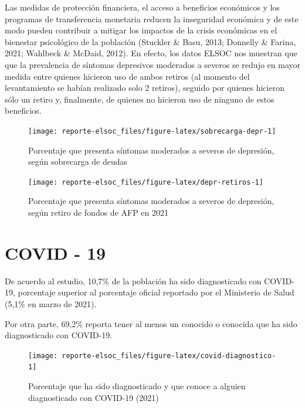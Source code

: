 \documentclass[
  12pt,
]{book}
\begin{document}
Las medidas de protección financiera, el acceso a beneficios económicos y los programas de transferencia monetaria reducen la inseguridad económica y de este modo pueden contribuir a mitigar los impactos de la crisis económicas en el bienestar psicológico de la población (Stuckler \& Basu, 2013; Donnelly \& Farina, 2021; Wahlbeck \& McDaid, 2012). En efecto, los datos ELSOC nos muestran que que la prevalencia de síntomas depresivos moderados a severos se redujo en mayor medida entre quienes hicieron uso de ambos retiros (al momento del levantamiento se habían realizado solo 2 retiros), seguido por quienes hicieron sólo un retiro y, finalmente, de quienes no hicieron uso de ninguno de estos beneficios.

\begin{figure}

{\centering \texttt{[image: reporte-elsoc\_files/figure-latex/sobrecarga-depr-1]} 

}

\caption{Porcentaje que presenta síntomas moderados a severos de depresión, según sobrecarga de deudas}\label{fig:sobrecarga-depr}
\end{figure}

\begin{figure}

{\centering \texttt{[image: reporte-elsoc\_files/figure-latex/depr-retiros-1]} 

}

\caption{Porcentaje que presenta síntomas moderados a severos de depresión, según retiro de fondos de AFP en 2021}\label{fig:depr-retiros}
\end{figure}

\hypertarget{covid---19}{%
\section{COVID - 19}\label{covid---19}}

De acuerdo al estudio, 10,7\% de la población ha sido diagnosticado con COVID-19, porcentaje superior al porcentaje oficial reportado por el Ministerio de Salud (5,1\% en marzo de 2021).

Por otra parte, 69,2\% reporta tener al menos un conocido o conocida que ha sido diagnosticado con COVID-19.

\begin{figure}

{\centering \texttt{[image: reporte-elsoc\_files/figure-latex/covid-diagnostico-1]} 

}

\caption{Porcentaje que ha sido diagnosticado y que conoce a alguien diagnosticado con COVID-19 (2021)}\label{fig:covid-diagnostico}
\end{figure}
\end{document}
